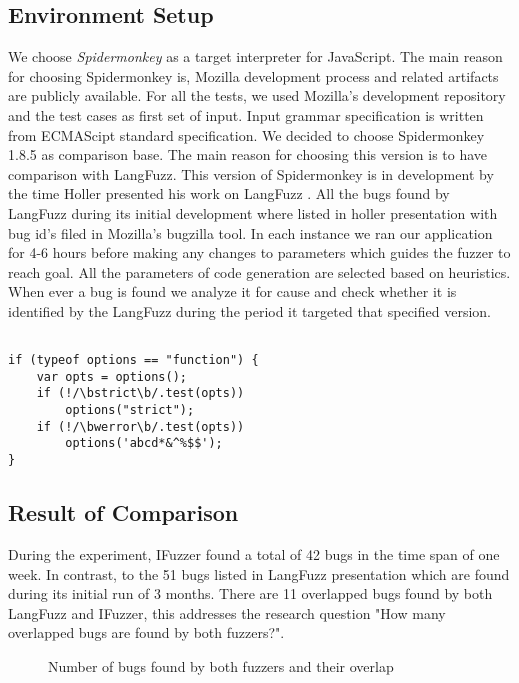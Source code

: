 \documentclass{acm_proc_article-sp}
\begin{document}
\subsection{Environment Setup}
We choose \textit{Spidermonkey} as a target interpreter for JavaScript. The main reason for choosing Spidermonkey is, Mozilla development process and related artifacts are publicly available. For all the tests, we used Mozilla's development repository and the test cases as first set of input. Input grammar specification is written from ECMAScipt standard specification. We decided to choose Spidermonkey 1.8.5 as comparison base. The main reason for choosing this version is to have comparison with LangFuzz. This version of Spidermonkey is in development by the time Holler presented his work on LangFuzz \cite{Holler11}. All the bugs found by LangFuzz during its initial development where listed in holler presentation with bug id's filed in Mozilla's bugzilla tool. In each instance we ran our application for 4-6 hours before making any changes to parameters which guides the fuzzer to reach goal. All the parameters of code generation are selected based on heuristics. When ever a bug is found we analyze it for cause and check whether it is identified by the LangFuzz during the period it targeted that specified version.  

\begin{lstlisting}

if (typeof options == "function") {
    var opts = options();
    if (!/\bstrict\b/.test(opts)) 
    	options("strict");
    if (!/\bwerror\b/.test(opts)) 
    	options('abcd*&^%$$');
}
\end{lstlisting}


\subsection{Result of Comparison}
During the experiment, IFuzzer found  a total of 42 bugs in the time span of one week. In contrast, to the 51 bugs listed in LangFuzz presentation which are found during its initial run of 3 months. There are 11 overlapped bugs found by both LangFuzz and IFuzzer, this addresses the research question "How many overlapped bugs are found by both fuzzers?". 

\begin{figure}[h]
\centering
{}
\caption {Number of bugs found by both fuzzers and their overlap}
\label{fig5}
\end{figure}
\end{document}
